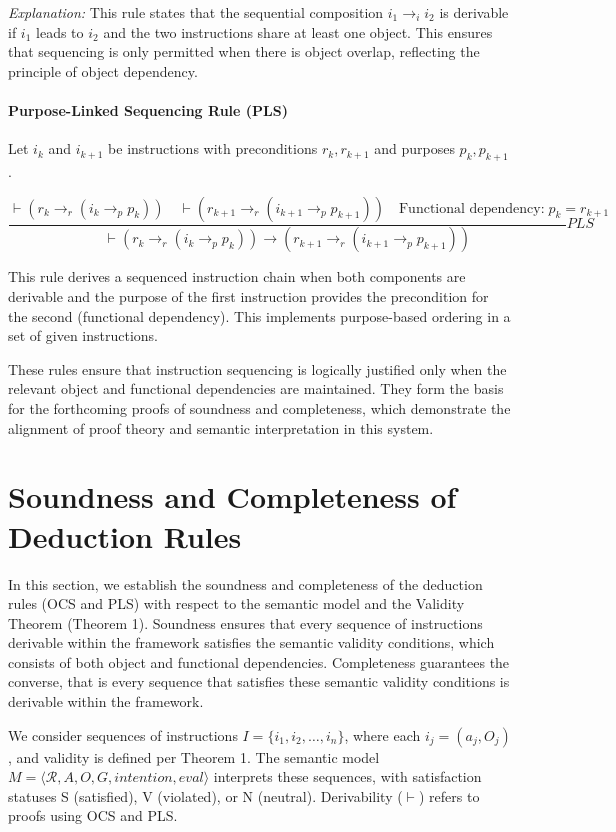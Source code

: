 \documentclass[a4paper,11pt]{lmcs}
\begin{document}
\emph{Explanation:}
This rule states that the sequential composition $i_1 \rightarrow_i i_2$ is derivable if $i_1$ leads to $i_2$ and the two instructions share at least one object. This ensures that sequencing is only permitted when there is object overlap, reflecting the principle of object dependency.

\paragraph{Purpose-Linked Sequencing Rule (PLS)}

Let $i_k$ and $i_{k+1}$ be instructions with preconditions $r_k, r_{k+1}$ and purposes $p_k, p_{k+1}$.

\[
\frac{
  \vdash (r_k \rightarrow_r (i_k \rightarrow_p p_k)) \quad
  \vdash (r_{k+1} \rightarrow_r (i_{k+1} \rightarrow_p p_{k+1})) \quad
  \text{Functional dependency:}\; p_k = r_{k+1}
}{
  \vdash (r_k \rightarrow_r (i_k \rightarrow_p p_k)) \rightarrow (r_{k+1} \rightarrow_r (i_{k+1} \rightarrow_p p_{k+1}))
}PLS
\]

This rule derives a sequenced instruction chain when both components are derivable and the purpose of the first instruction provides the precondition for the second (functional dependency). This implements purpose-based ordering in a set of given instructions.

These rules ensure that instruction sequencing is logically justified only when the relevant object and functional dependencies are maintained. They form the basis for the forthcoming proofs of soundness and completeness, which demonstrate the alignment of proof theory and semantic interpretation in this system.

\section{Soundness and Completeness of Deduction Rules}
\label{sec:sound_complete}
In this section, we establish the soundness and completeness of the deduction rules (OCS and PLS) with respect to the semantic model and the Validity Theorem (Theorem 1).
Soundness ensures that every sequence of instructions derivable within the framework satisfies the semantic validity conditions, which consists of both object and functional dependencies.
Completeness guarantees the converse, that is every sequence that satisfies these semantic validity conditions is derivable within the framework.

We consider sequences of instructions \( I = \{i_1, i_2, \dots, i_n\} \), where each \( i_j = (a_j, O_j) \), and validity is defined per Theorem 1. The semantic model \( M = \langle \mathcal{R}, A, O, G, \textit{intention}, \textit{eval} \rangle \) interprets these sequences, with satisfaction statuses S (satisfied), V (violated), or N (neutral). Derivability (\( \vdash \)) refers to proofs using OCS and PLS.
\end{document}
